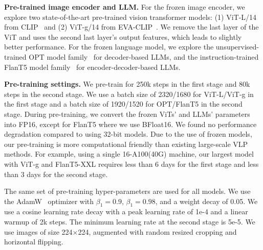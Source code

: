 \noindent\textbf{Pre-trained image encoder and LLM.}
For the frozen image encoder, we explore two state-of-the-art pre-trained vision transformer models: (1) ViT-L/14 from CLIP~\cite{clip} and (2) ViT-g/14 from EVA-CLIP~\cite{eva}.
We remove the last layer of the ViT and uses the second last layer's output features,
which leads to slightly better performance.
For the frozen language model,
we explore the unsupervised-trained OPT model family~\cite{opt} for decoder-based LLMs,
and the instruction-trained FlanT5 model family~\cite{flanT5} for encoder-decoder-based LLMs.




\noindent\textbf{Pre-training settings.}
We pre-train for 250k steps in the first stage and 80k steps in the second stage.
We use a batch size of 2320/1680 for ViT-L/ViT-g in the first stage and a batch size of 1920/1520 for OPT/FlanT5 in the second stage.
During pre-training, we convert the frozen ViTs' and LLMs' parameters into FP16, except for FlanT5 where we use BFloat16.
We found no performance degradation compared to using 32-bit models.
Due to the use of frozen models,
our pre-training is more computational friendly than existing large-scale VLP methods.
For example,
using a single 16-A100(40G) machine,
our largest model with ViT-g and FlanT5-XXL requires less than 6 days for the first stage and less than 3 days for the second stage.

The same set of pre-training hyper-parameters are used for all models.
We use the AdamW~\cite{adamw} optimizer with $\beta_1=0.9$, $\beta_1=0.98$, and a weight decay of 0.05.
We use a cosine learning rate decay with a peak learning rate of 1e-4 and a linear warmup of 2k steps. 
The minimum learning rate at the second stage is 5e-5.
We use images of size 224$\times$224, augmented with random resized cropping and horizontal flipping.









